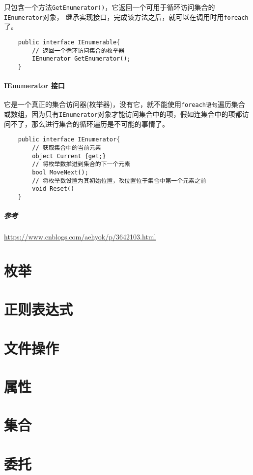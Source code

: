 \documentclass[UTF8,a4paper,12pt]{ctexbook}
\begin{document}
			只包含一个方法\verb|GetEnumerator()|，它返回一个可用于循环访问集合的\verb|IEnumerator|对象，
			继承实现接口，完成该方法之后，就可以在调用时用\verb|foreach|了。
		
			\begin{lstlisting}
	public interface IEnumerable{
		// 返回一个循环访问集合的枚举器
		IEnumerator GetEnumerator();
	}
			\end{lstlisting}
		\paragraph{IEnumerator 接口} 
			
			它是一个真正的集合访问器(枚举器)，没有它，就不能使用\verb|foreach语句|遍历集合或数组，因为只有\verb|IEnumerator|对象才能访问集合中的项，假如连集合中的项都访问不了，那么进行集合的循环遍历是不可能的事情了。
			
			\begin{lstlisting}
	public interface IEnumerator{
		// 获取集合中的当前元素
		object Current {get;}
		// 将枚举数推进到集合的下一个元素
		bool MoveNext();
		// 将枚举数设置为其初始位置，改位置位于集合中第一个元素之前
		void Reset()
	}
			\end{lstlisting}
			
			\subparagraph{参考}\url{https://www.cnblogs.com/aehyok/p/3642103.html}
				
			
	\section{枚举}
	
	\section{正则表达式}
	
	\section{文件操作}
	
	\section{属性}
	
	\section{集合}

	\newpage
 	\section{委托}
\end{document}
